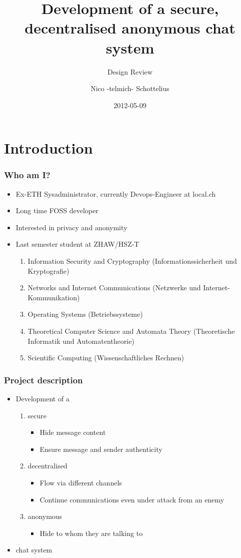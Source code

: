 \documentclass{beamer}
\title{Development of a secure, decentralised anonymous chat system}
\subtitle{Design Review}
\author{Nico -telmich- Schottelius}
\date{2012-05-09}
\begin{document}
\frame{\titlepage}

\frame{\tableofcontents}

\section{Introduction}
\frame
{
  \frametitle{Who am I?}
  \begin{itemize}
  \item Ex-ETH Sysadministrator, currently Devops-Engineer at local.ch
  \item Long time FOSS developer 
  \item Interested in privacy and anonymity
  \item Last semester student at ZHAW/HSZ-T
  \begin{enumerate}
      \item  Information Security and Cryptography (Informationssicherheit und Kryptografie)
      \item  Networks and Internet Communications (Netzwerke und Internet-Kommunikation)
      \item  Operating Systems (Betriebssysteme)
      \item  Theoretical Computer Science and Automata Theory (Theoretische Informatik und Automatentheorie)
      \item  Scientific Computing (Wissenschaftliches Rechnen)
  \end{enumerate}
  \end{itemize}
}

\frame
{
  \frametitle{Project description}
  \begin{itemize}
  \item Development of a
  \begin{enumerate}
      \item  secure
          \begin{itemize}
          \item Hide message content
          \item Ensure message and sender authenticity
          \end{itemize}
      \item  decentralised
          \begin{itemize}
          \item Flow via different channels
          \item Continue communications even under attack from an enemy
          \end{itemize}
      \item  anonymous
          \begin{itemize}
          \item Hide to whom they are talking to
          \end{itemize}
  \end{enumerate}
  \item chat system
  \end{itemize}
}
\end{document}
